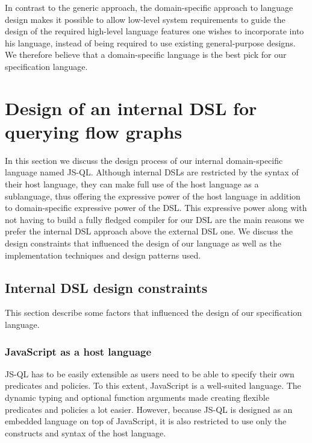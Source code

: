 In contrast to the generic approach, the domain-specific approach to language design makes it possible to allow low-level system requirements to guide the design of the required high-level language features one wishes to incorporate into his language, instead of being required to use existing general-purpose designs.
We therefore believe that a domain-specific language is the best pick for our specification language.

\section{Design of an internal DSL for querying flow graphs}
\label{sec:DesignInternalDSL}

In this section we discuss the design process of our internal domain-specific language named JS-QL.
Although internal DSLs are restricted by the syntax of their host language, they can make full use of the host language as a sublanguage, thus offering the expressive power of the host language in addition to domain-specific expressive power of the DSL. This expressive power along with not having to build a fully fledged compiler for our DSL are the main reasons we prefer the internal DSL approach above the external DSL one. We discuss the design constraints that influenced the design of our language as well as the implementation techniques and design patterns used.

\subsection{Internal DSL design constraints}

This section describe some factors that influenced the design of our specification language.

\subsubsection{JavaScript as a host language}

JS-QL has to be easily extensible as users need to be able to specify their own predicates and policies. To this extent, JavaScript is a well-suited language. The dynamic typing and optional function arguments made creating flexible predicates and policies a lot easier. However, because JS-QL is designed as an embedded language on top of JavaScript, it is also restricted to use only the constructs and syntax of the host language.


